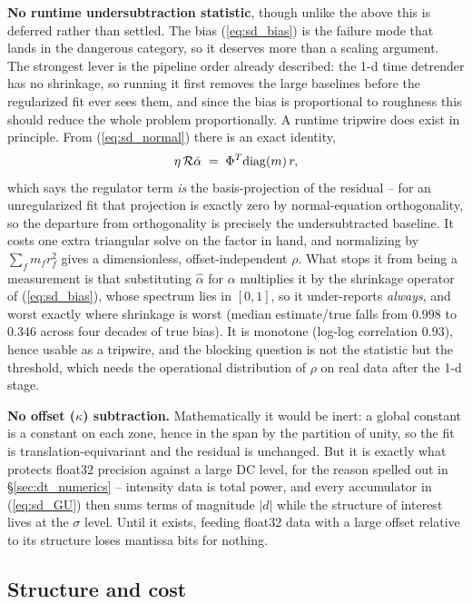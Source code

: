 \documentclass{article}
\numberwithin{equation}{section}   %
\begin{document}
{\bf No runtime undersubtraction statistic}, though unlike the above this is deferred rather than settled.  The
bias (\ref{eq:sd_bias}) is the failure mode that lands in the dangerous category, so it deserves more than a
scaling argument.  The strongest lever is the pipeline order already described: the 1-d time detrender has no
shrinkage, so running it first removes the large baselines before the regularized fit ever sees them, and since
the bias is proportional to roughness this should reduce the whole problem proportionally.  A runtime tripwire
does exist in principle.  From (\ref{eq:sd_normal}) there is an exact identity,
\begin{equation}
\eta\,{\cal R}\hat\alpha \;=\; \Phi^T {\rm diag}(m)\, r ,
\label{eq:sd_rho}
\end{equation}
which says the regulator term {\em is} the basis-projection of the residual -- for an unregularized fit that
projection is exactly zero by normal-equation orthogonality, so the departure from orthogonality is precisely
the undersubtracted baseline.  It costs one extra triangular solve on the factor in hand, and normalizing by
$\sum_f m_f r_f^2$ gives a dimensionless, offset-independent $\rho$.  What stops it from being a measurement is
that substituting $\hat\alpha$ for $\alpha$ multiplies it by the shrinkage operator of (\ref{eq:sd_bias}),
whose spectrum lies in $[0,1]$, so it under-reports {\em always}, and worst exactly where shrinkage is worst
(median estimate/true falls from $0.998$ to $0.346$ across four decades of true bias).  It is monotone
(log-log correlation $0.93$), hence usable as a tripwire, and the blocking question is not the statistic but the
threshold, which needs the operational distribution of $\rho$ on real data after the 1-d stage.

{\bf No offset ($\kappa$) subtraction.}  Mathematically it would be inert: a global constant is a constant on
each zone, hence in the span by the partition of unity, so the fit is translation-equivariant and the residual
is unchanged.  But it is exactly what protects float32 precision against a large DC level, for the reason
spelled out in \S\ref{sec:dt_numerics} -- intensity data is total power, and every accumulator in
(\ref{eq:sd_GU}) then sums terms of magnitude $|d|$ while the structure of interest lives at the $\sigma$
level.  Until it exists, feeding float32 data with a large offset relative to its structure loses mantissa bits
for nothing.

\subsection{Structure and cost}
\label{sec:sd_cost}
\end{document}
